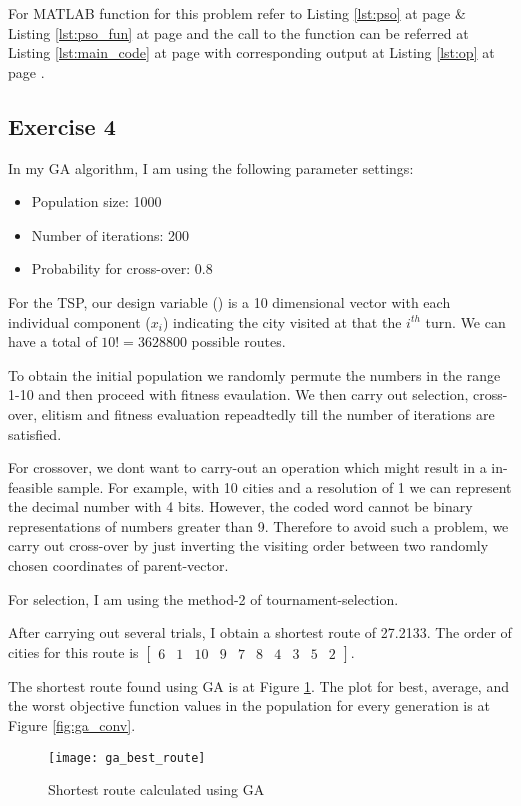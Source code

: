 \documentclass[11pt]{article}
\newcommand{\V}[1]{\pmb{#1}}
\newcommand{\mat}[1]{\begin{bmatrix}#1\end{bmatrix}}
\newcommand{\reflst}[1]{Listing \ref{#1} at page \pageref{#1}}
\newcommand{\reffig}[1]{Figure \ref{#1}}
\begin{document}
\noindent For MATLAB function for this problem refer to \reflst{lst:pso} \& \reflst{lst:pso_fun} and the call to the function can be referred at \reflst{lst:main_code} with corresponding output at \reflst{lst:op}.
%
\clearpage
\vspace{2ex}
\subsection*{Exercise 4} 
In my GA algorithm, I am using the following parameter settings:
\begin{itemize}
 \item Population size: 1000
 \item Number of iterations: 200
 \item Probability for cross-over: 0.8
\end{itemize}

\noindent For the TSP, our design variable (\V{x}) is a 10 dimensional vector with each individual component ($x_i$) indicating the city visited at that the $i^{th}$ turn. We can have a total of $10!=3628800$ possible routes. 

\noindent To obtain the initial population we randomly permute the numbers in the range 1-10 and then proceed with fitness evaulation. We then carry out selection, cross-over, elitism and fitness evaluation repeadtedly till the number of iterations are satisfied. 

\noindent For crossover, we dont want to carry-out an operation which might result in a in-feasible sample. For example, with 10 cities and a resolution of 1 we can represent the decimal number with 4 bits. However, the coded word cannot be binary representations of numbers greater than 9. Therefore to avoid such a problem, we carry out cross-over by just inverting the visiting order between two randomly chosen coordinates of parent-vector.

\noindent For selection, I am using the method-2 of tournament-selection.

\noindent After carrying out several trials, I obtain a shortest route of 27.2133. The order of cities for this route is $\mat{6& 1 &10 &9 &7 &8 &4 &3 &5 &2 }$. 

\noindent The shortest route found using GA is at \reffig{fig:ga_route}. The plot for best, average, and the worst objective function values in the population for every generation is at \reffig{fig:ga_conv}.

\begin{figure}[!h]
  \centering
 \texttt{[image: ga\_best\_route]}
 \caption{Shortest route calculated using GA}
 \label{fig:ga_route}
\end{figure}
\end{document}
